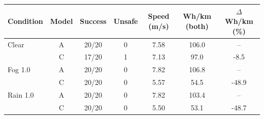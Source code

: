 \begin{tabular}{lcccccc}
\hline
Condition & Model & Success & Unsafe & Speed (m/s) & Wh/km (both) & $\Delta$ Wh/km (\%) \\
\hline
Clear & A & 20/20 & 0 & 7.58 & 106.0 & -- \\
 & C & 17/20 & 1 & 7.13 & 97.0 & -8.5 \\
Fog 1.0 & A & 20/20 & 0 & 7.82 & 106.8 & -- \\
 & C & 20/20 & 0 & 5.57 & 54.5 & -48.9 \\
Rain 1.0 & A & 20/20 & 0 & 7.82 & 103.4 & -- \\
 & C & 20/20 & 0 & 5.50 & 53.1 & -48.7 \\
\hline
\end{tabular}